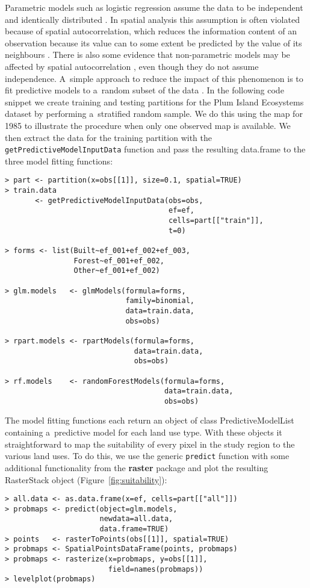 \documentclass{icldt}\usepackage[]{graphicx}\usepackage[]{color}
\begin{document}
Parametric models such as logistic regression assume the data to be independent and identically distributed \citep{overmars2003}. In spatial analysis this assumption is often violated because of spatial autocorrelation, which reduces the information content of an observation because its value can to some extent be predicted by the value of its neighbours \citep{beale2010}. There is also some evidence that non-parametric models may be affected by spatial autocorrelation \citet{mascaro2014}, even though they do not assume independence. A~simple approach to reduce the impact of this phenomenon is to fit predictive models to a~random subset of the data \citep[e.g.][]{verburg2002,wassenaar2007,echeverria2008}. In the following code snippet we create training and testing partitions for the Plum Island Ecosystems dataset by performing a~stratified random sample. We do this using the map for 1985 to illustrate the procedure when only one observed map is available. We then extract the data for the training partition with the \texttt{getPredictiveModelInputData} function and pass the resulting data.frame to the three model fitting functions:
\begin{verbatim}
> part <- partition(x=obs[[1]], size=0.1, spatial=TRUE) 
> train.data 
       <- getPredictiveModelInputData(obs=obs, 
                                      ef=ef, 
                                      cells=part[["train"]], 
                                      t=0) 

> forms <- list(Built~ef_001+ef_002+ef_003, 
                Forest~ef_001+ef_002, 
                Other~ef_001+ef_002) 

> glm.models   <- glmModels(formula=forms, 
                            family=binomial, 
                            data=train.data, 
                            obs=obs) 

> rpart.models <- rpartModels(formula=forms, 
                              data=train.data, 
                              obs=obs) 

> rf.models    <- randomForestModels(formula=forms, 
                                     data=train.data, 
                                     obs=obs)
\end{verbatim}
\noindent The model fitting functions each return an object of class PredictiveModelList containing a~predictive model for each land use type. With these objects it straightforward to map the suitability of every pixel in the study region to the various land uses. To do this, we use the generic \texttt{predict} function with some additional functionality from the \textbf{raster} package and plot the resulting RasterStack object (Figure~\ref{fig:suitability}):
\begin{verbatim}
> all.data <- as.data.frame(x=ef, cells=part[["all"]]) 
> probmaps <- predict(object=glm.models, 
                      newdata=all.data, 
                      data.frame=TRUE) 
> points   <- rasterToPoints(obs[[1]], spatial=TRUE) 
> probmaps <- SpatialPointsDataFrame(points, probmaps) 
> probmaps <- rasterize(x=probmaps, y=obs[[1]], 
                        field=names(probmaps)) 
> levelplot(probmaps)
\end{verbatim}
\end{document}
